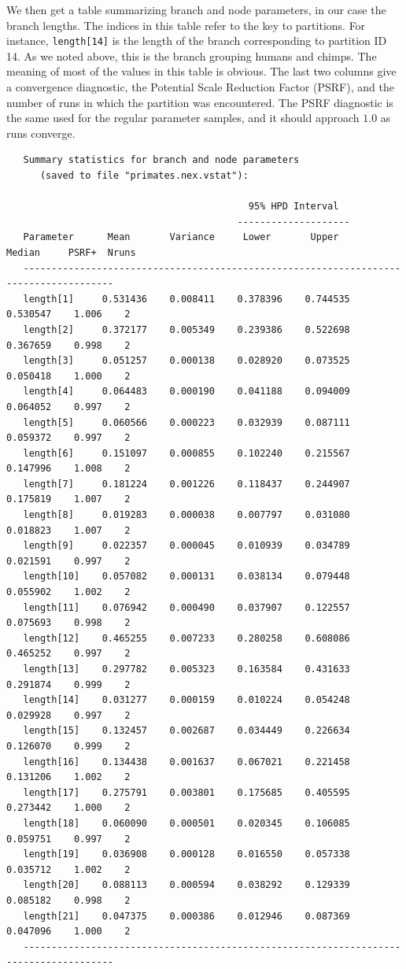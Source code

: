 \documentclass[12pt]{book}
\newcommand{\ttt}[1]{\texttt{#1}}
\begin{document}
We then get a table summarizing branch and node parameters, in our case the branch lengths. The
indices in this table refer to the key to partitions. For instance, \ttt{length[14]} is the length
of the branch corresponding to partition ID 14. As we noted above, this is the branch grouping
humans and chimps. The meaning of most of the values in this table is obvious. The last two columns
give a convergence diagnostic, the Potential Scale Reduction Factor (PSRF), and the number of runs
in which the partition was encountered. The PSRF diagnostic is the same used for the regular
parameter samples, and it should approach $1.0$ as runs converge.

\begin{singlespacing}
\scriptsize
\begin{verbatim}
   Summary statistics for branch and node parameters
      (saved to file "primates.nex.vstat"):

                                           95% HPD Interval
                                         --------------------
   Parameter      Mean       Variance     Lower       Upper       Median     PSRF+  Nruns
   --------------------------------------------------------------------------------------
   length[1]     0.531436    0.008411    0.378396    0.744535    0.530547    1.006    2
   length[2]     0.372177    0.005349    0.239386    0.522698    0.367659    0.998    2
   length[3]     0.051257    0.000138    0.028920    0.073525    0.050418    1.000    2
   length[4]     0.064483    0.000190    0.041188    0.094009    0.064052    0.997    2
   length[5]     0.060566    0.000223    0.032939    0.087111    0.059372    0.997    2
   length[6]     0.151097    0.000855    0.102240    0.215567    0.147996    1.008    2
   length[7]     0.181224    0.001226    0.118437    0.244907    0.175819    1.007    2
   length[8]     0.019283    0.000038    0.007797    0.031080    0.018823    1.007    2
   length[9]     0.022357    0.000045    0.010939    0.034789    0.021591    0.997    2
   length[10]    0.057082    0.000131    0.038134    0.079448    0.055902    1.002    2
   length[11]    0.076942    0.000490    0.037907    0.122557    0.075693    0.998    2
   length[12]    0.465255    0.007233    0.280258    0.608086    0.465252    0.997    2
   length[13]    0.297782    0.005323    0.163584    0.431633    0.291874    0.999    2
   length[14]    0.031277    0.000159    0.010224    0.054248    0.029928    0.997    2
   length[15]    0.132457    0.002687    0.034449    0.226634    0.126070    0.999    2
   length[16]    0.134438    0.001637    0.067021    0.221458    0.131206    1.002    2
   length[17]    0.275791    0.003801    0.175685    0.405595    0.273442    1.000    2
   length[18]    0.060090    0.000501    0.020345    0.106085    0.059751    0.997    2
   length[19]    0.036908    0.000128    0.016550    0.057338    0.035712    1.002    2
   length[20]    0.088113    0.000594    0.038292    0.129339    0.085182    0.998    2
   length[21]    0.047375    0.000386    0.012946    0.087369    0.047096    1.000    2
   --------------------------------------------------------------------------------------
\end{verbatim}
\normalsize
\end{singlespacing}
\end{document}
